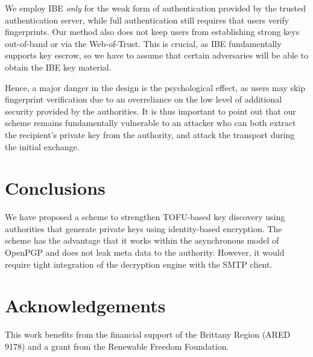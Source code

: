 \documentclass[twoside,letterpaper]{sig-alternate}
\begin{document}
We employ IBE {\em only} for the weak form of authentication provided
by the trusted authentication server, while full authentication still
requires that users verify fingerprints.  Our method also does not
keep users from establishing strong keys out-of-band or via the
Web-of-Trust.  This is crucial, as IBE fundamentally supports key
escrow, so we have to assume that certain adversaries will be able to
obtain the IBE key material.

Hence, a major danger in the design is the psychological effect, as
users may skip fingerprint verification due to an overreliance on the
low level of additional security provided by the authorities.  It is
thus important to point out that our scheme remains fundamentally
vulnerable to an attacker who can both extract the recipient's private
key from the authority, and attack the transport during the initial
exchange.


\section{Conclusions}

We have proposed a scheme to strengthen TOFU-based key discovery using
authorities that generate private keys using identity-based
encryption.  The scheme has the advantage that it works within the
asynchronous model of OpenPGP and does not leak meta data to the
authority.  However, it would require tight integration of the
decryption engine with the SMTP client.


\section*{Acknowledgements}

This work benefits from the financial support of the Brittany Region
(ARED 9178) and a grant from the Renewable Freedom Foundation.





\end{document}
